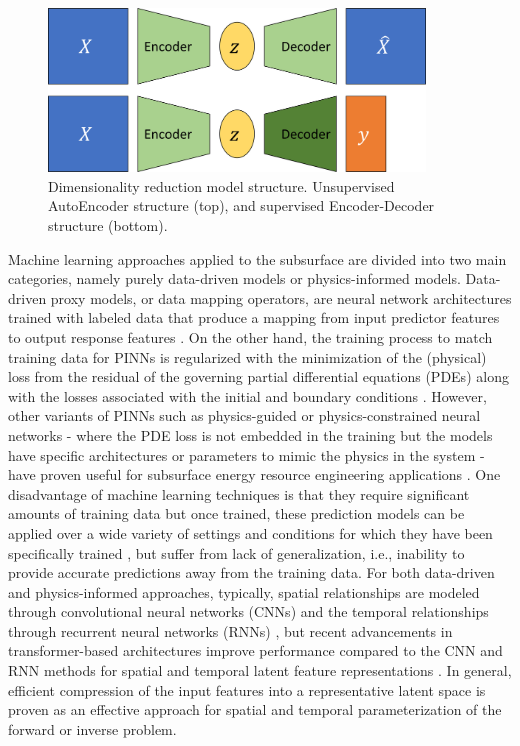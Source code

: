 \documentclass[10pt, twoside]{article}
\begin{document}
\begin{figure}
    \centering
    \includegraphics[width=10cm]{figures/latentAE.png}
    \caption{Dimensionality reduction model structure. Unsupervised AutoEncoder structure (top), and supervised Encoder-Decoder structure (bottom).}
    \label{latentAE}
\end{figure}

Machine learning approaches applied to the subsurface are divided into two main categories, namely purely data-driven models or physics-informed models. Data-driven proxy models, or data mapping operators, are neural network architectures trained with labeled data that produce a mapping from input predictor features to output response features \cite{Oladyshkin2013671, Bao2019}. On the other hand, the training process to match training data for PINNs is regularized with the minimization of the (physical) loss from the residual of the governing partial differential equations (PDEs) along with the losses associated with the initial and boundary conditions \cite{karniadakis2021physics, yang2018physicsinformed}. However, other variants of PINNs such as physics-guided or physics-constrained neural networks - where the PDE loss is not embedded in the training but the models have specific architectures or parameters to mimic the physics in the system - have proven useful for subsurface energy resource engineering applications \cite{Wang2021, Coutinho2021, Zhu_2019}. One disadvantage of machine learning techniques is that they require significant amounts of training data but once trained, these prediction models can be applied over a wide variety of settings and conditions for which they have been specifically trained \cite{Yegnanarayana2009ArtificialNetworks, heaton2018ian}, but suffer from lack of generalization, i.e., inability to provide accurate predictions away from the training data. For both data-driven and physics-informed approaches, typically, spatial relationships are modeled through convolutional neural networks (CNNs) \cite{liu20213d, Yang2022} and the temporal relationships through recurrent neural networks (RNNs) \cite{jiang2021data, Ning2022}, but recent advancements in transformer-based architectures improve performance compared to the CNN and RNN methods for spatial and temporal latent feature representations \cite{liu2021swin, 10.1190/geo2022-0150.1, maldonado4403939multi}. In general, efficient compression of the input features into a representative latent space is proven as an effective approach for spatial and temporal parameterization of the forward or inverse problem.
\end{document}
